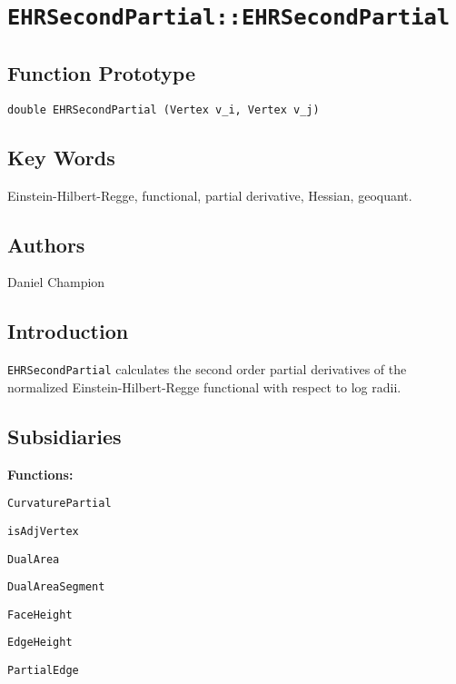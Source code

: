                       

\section*{\texttt{EHRSecondPartial::EHRSecondPartial}}

\subsection*{Function Prototype}

\texttt{double EHRSecondPartial (Vertex v\_i, Vertex v\_j)}

\subsection*{Key Words}

Einstein-Hilbert-Regge, functional, partial derivative, Hessian, geoquant.

\subsection*{Authors}

Daniel Champion

\subsection*{Introduction}

\texttt{EHRSecondPartial} calculates the second order partial derivatives of
the normalized Einstein-Hilbert-Regge functional with respect to log radii.
\ 

\subsection*{Subsidiaries}

\textbf{Functions:}

\qquad \texttt{CurvaturePartial}

\qquad\qquad\texttt{isAdjVertex}

\qquad \qquad \texttt{DualArea}

\qquad \qquad \qquad \texttt{DualAreaSegment}

\qquad \qquad \qquad \qquad \texttt{FaceHeight}

\qquad \qquad \qquad \qquad \qquad \texttt{EdgeHeight}

\qquad \qquad \qquad \qquad \qquad \qquad \texttt{PartialEdge}

